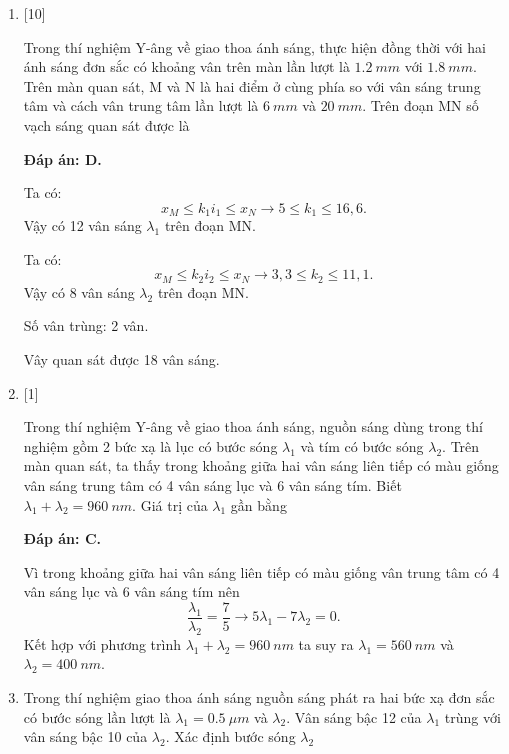 \begin{enumerate}[label=\bfseries Câu \arabic*:]
	\item {} [10]
	\cauhoi
	{Trong thí nghiệm Y-âng về giao thoa ánh sáng, thực hiện đồng thời với hai ánh sáng đơn sắc có khoảng vân trên màn lần lượt là $\SI{1,2}{mm}$ với $\SI{1,8}{mm}$. Trên màn quan sát, M và N là hai điểm ở cùng phía so với vân sáng trung tâm và cách vân trung tâm lần lượt là $\SI{6}{mm}$ và $\SI{20}{mm}$. Trên đoạn MN số vạch sáng quan sát được là
	}
	
	\loigiai
	{		\textbf{Đáp án: D.}
		
		Ta có:
		$$
		x_{M} \leq k_{1}i_{1} \leq x_{N} \rightarrow 5 \leq k_{1} \leq 16,6.                             
		$$
		Vậy có 12 vân sáng $\lambda_{1}$ trên đoạn MN.
		
		Ta có:
		$$
		x_{M} \leq k_{2}i_{2} \leq x_{N} \rightarrow 3,3 \leq k_{2} \leq 11,1.                             
		$$
		Vậy có 8 vân sáng $\lambda_{2}$ trên đoạn MN.
		
		Số vân trùng: 2 vân.
		
		Vây quan sát được 18 vân sáng.
	}
	
	\item {} [1]
	\cauhoi
	{Trong thí nghiệm Y-âng về giao thoa ánh sáng, nguồn sáng dùng trong thí nghiệm gồm 2 bức xạ là lục có bước sóng $\lambda_{1}$ và tím có bước sóng $\lambda_{2}$. Trên màn quan sát, ta thấy trong khoảng giữa hai vân sáng liên tiếp có màu giống vân sáng trung tâm có 4 vân sáng lục và 6 vân sáng tím. Biết $\lambda_{1} + \lambda_{2} = \SI{960}{nm}$. Giá trị của $\lambda_{1}$ gần bằng 
	}
	
	\loigiai
	{		\textbf{Đáp án: C.}
		
		Vì trong khoảng giữa hai vân sáng liên tiếp có màu giống vân trung tâm có 4 vân sáng lục và 6 vân sáng tím nên
		$$
		\dfrac{\lambda_{1}}{\lambda_{2}} = \dfrac{7}{5}  \rightarrow 5\lambda_{1} - 7\lambda_{2} = 0.
		$$
		Kết hợp với phương trình $\lambda_{1} + \lambda_{2} = \SI{960}{nm}$ ta suy ra $\lambda_{1} = \SI{560}{nm}$ và $\lambda_{2} = \SI{400}{nm}$.
	}
		\item {} 
	\cauhoi
	{Trong thí nghiệm giao thoa ánh sáng nguồn sáng phát ra hai bức xạ đơn sắc có bước sóng lần lượt là $\lambda_1 = \SI{0,5}{\mu m}$ và $\lambda_2$. Vân sáng bậc 12 của $\lambda_1$  trùng với vân sáng bậc 10 của $\lambda_2$. Xác định bước sóng  $\lambda_2$
		
}
\end{enumerate}
